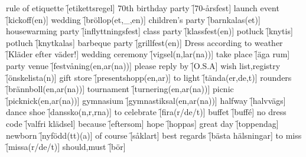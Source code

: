 \begin{questions}
\begin{multicols}{2}
        \question rule of etiquette \f[etikettsregel]
        \question 70th birthday party \f[70-årsfest]
        \question launch event \f[kickoff(en)]
        \question wedding \f[bröllop(et,\_,en)]
        \question children's party \f[barnkalas(et)]
        \question housewarming party \f[inflyttningsfest]
        \question class party \f[klassfest(en)]
        \question potluck \f[knytis]
        \question potluch \f[knytkalas]
        \question barbeque party \f[grillfest(en)]
        \question Dress according to weather \f[Kläder efter väder!]
        \question wedding ceremony \f[vigsel(n,lar(na))]
        \question take place \f[äga rum]
        \question party venue \f[festvåning(en,ar(na))]
        \question please reply by \f[O.S.A]
        \question wish list,registry \f[önskelista(n)]
        \question gift store \f[presentshopp(en,ar)]
        \question to light \f[tända(er,de,t)]
        \question rounders \f[brännboll(en,ar(na))]
        \question tournament \f[turnering(en,ar(na))]
        \question picnic \f[picknick(en,ar(na))]
        \question gymnasium \f[gymnastiksal(en,ar(na))]
        \question halfway \f[halvvägs]
        \question dance shoe \f[danssko(n,r,rna)]
        \question to celebrate \f[fira(r/de/t)]
        \question buffet \f[buff\'e]
        \question no dress code \f[valfri klädsel]
        \question because \f[eftersom]
        \question hope \f[hoppas]
        \question great day \f[toppendag]
        \question newborn \f[nyfödd(tt)(a)]
        \question of course \f[såklart]
        \question best regards \f[bästa hälsningar]
        \question to miss \f[missa(r/de/t)]
        \question should,must \f[bör]
    \end{multicols}
\end{questions}
